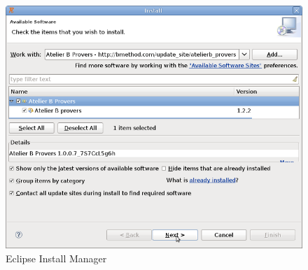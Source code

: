 
\begin{figure}[!h]
\begin{center}
	\includegraphics{img/tutorial/tut_02_install3.png}
	\caption{Eclipse Install Manager}
	\label{fig_tut_02_install_manager}
\end{center}
\end{figure}

